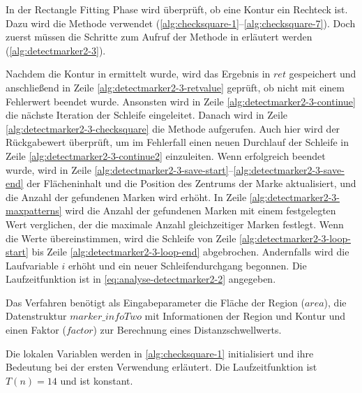 In der Rectangle Fitting Phase wird überprüft, ob eine Kontur ein Rechteck ist. Dazu wird die Methode
  verwendet (\autoref{alg:checksquare-1}--\autoref{alg:checksquare-7}). Doch zuerst müssen die
 Schritte zum Aufruf der Methode in  erläutert werden
 (\autoref{alg:detectmarker2-3}).

Nachdem die Kontur in  ermittelt wurde, wird das Ergebnis in $\mathit{ret}$ gespeichert und
 anschließend in Zeile \ref{alg:detectmarker2-3-retvalue} geprüft, ob  nicht mit einem
 Fehlerwert beendet wurde. Ansonsten wird in Zeile \ref{alg:detectmarker2-3-continue} die nächste Iteration der
 Schleife eingeleitet. Danach wird in Zeile \ref{alg:detectmarker2-3-checksquare} die Methode 
 aufgerufen. Auch hier wird der Rückgabewert überprüft, um im Fehlerfall einen neuen Durchlauf der Schleife in Zeile
 \ref{alg:detectmarker2-3-continue2} einzuleiten. Wenn  erfolgreich beendet wurde, wird in Zeile
 \ref{alg:detectmarker2-3-save-start}--\ref{alg:detectmarker2-3-save-end} der Flächeninhalt und die Position des
 Zentrums der Marke aktualisiert, und die Anzahl der gefundenen Marken wird erhöht. In Zeile
 \ref{alg:detectmarker2-3-maxpatterns} wird die Anzahl der gefundenen Marken mit einem festgelegten Wert verglichen,
 der die maximale Anzahl gleichzeitiger Marken festlegt. Wenn die Werte übereinstimmen, wird die Schleife von Zeile
 \ref{alg:detectmarker2-3-loop-start} bis Zeile \ref{alg:detectmarker2-3-loop-end} abgebrochen. Andernfalls wird die
 Laufvariable $i$ erhöht und ein neuer Schleifendurchgang begonnen. Die Laufzeitfunktion ist in
 \autoref{eq:analyse-detectmarker2-2} angegeben.


Das Verfahren  benötigt als Eingabeparameter die Fläche der Region ($\mathit{area}$), die
 Datenstruktur $\mathit{marker\_infoTwo}$ mit Informationen der Region und Kontur und einen Faktor ($\mathit{factor}$)
 zur Berechnung eines Distanzschwellwerts.

Die lokalen Variablen werden in \autoref{alg:checksquare-1} initialisiert und ihre Bedeutung bei der ersten Verwendung erläutert. Die Laufzeitfunktion ist $T(n) = 14$ und ist konstant.


